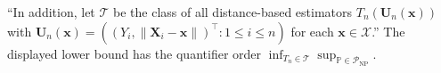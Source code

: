 ``In addition, let \(\mathcal T\) be the class of all distance-based estimators \(T_n(\mathbf U_n(\mathbf x))\) with \(\mathbf U_n(\mathbf x)=((Y_i,\lVert\mathbf X_i-\mathbf x\rVert)^\top:1\leq i\leq n)\) for each \(\mathbf x\in\mathcal X\).''  The displayed lower bound has the quantifier order \(\inf_{T_n\in\mathcal T}\sup_{\mathbb P\in\mathcal P_{\mathrm{NP}}}\).